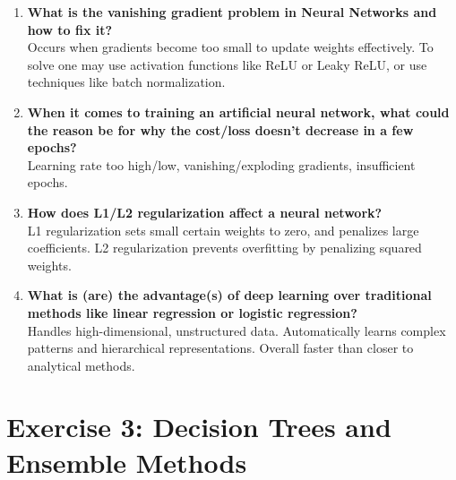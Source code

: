\documentclass[a4paper,12pt]{article}
\begin{document}
\begin{enumerate}
		\item \textbf{What is the vanishing gradient problem in Neural Networks and how to fix it?} \\
		Occurs when gradients become too small to update weights effectively. To solve one may use activation functions like ReLU or Leaky ReLU, or use techniques like batch normalization.
		
		\item \textbf{When it comes to training an artificial neural network, what could the reason be for why the cost/loss doesn’t decrease in a few epochs?} \\
		Learning rate too high/low, vanishing/exploding gradients, insufficient epochs.
		
		\item \textbf{How does L1/L2 regularization affect a neural network?} \\
		L1 regularization sets small certain weights to zero, and penalizes large coefficients. L2 regularization prevents overfitting by penalizing squared weights.
		
		\item \textbf{What is (are) the advantage(s) of deep learning over traditional methods like linear regression or logistic regression?} \\
		Handles high-dimensional, unstructured data. Automatically learns complex patterns and hierarchical representations. Overall faster than closer to analytical methods.
	\end{enumerate}
	
	\section*{Exercise 3: Decision Trees and Ensemble Methods}
	
\end{document}

